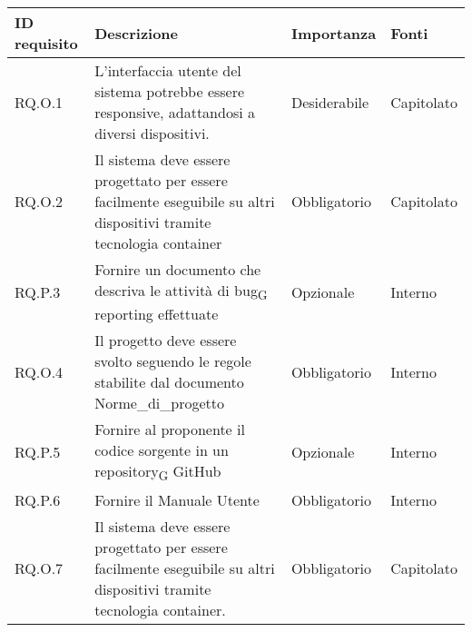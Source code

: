 \begin{longtable}{|C{2.7cm}|L{7.2cm}|C{2.7cm}|C{2cm}|}
        \hline
        \textbf{ID requisito} & \textbf{Descrizione} & \textbf{Importanza} & \textbf{Fonti}  \\
        \hline
       
        \hline
        RQ.O.1 & L'interfaccia utente del sistema potrebbe essere responsive, adattandosi a diversi dispositivi. & Desiderabile & Capitolato \\
        \hline
        RQ.O.2 & Il sistema deve essere progettato per essere facilmente eseguibile su altri dispositivi tramite tecnologia container & Obbligatorio & Capitolato \\
        
        \hline
        RQ.P.3 & Fornire un documento che descriva le attività di bug\textsubscript{G} reporting effettuate & Opzionale & Interno \\
        \hline
        RQ.O.4 & Il progetto deve essere svolto seguendo le regole stabilite dal documento Norme\_di\_progetto & Obbligatorio & Interno \\
        \hline
        RQ.P.5 & Fornire al proponente il codice sorgente in un
        repository\textsubscript{G} GitHub & Opzionale & Interno \\
        \hline
        RQ.P.6 & Fornire il Manuale Utente & Obbligatorio & Interno \\
        \hline
        RQ.O.7 & Il sistema deve essere progettato per essere facilmente eseguibile su altri dispositivi tramite tecnologia container. & Obbligatorio & Capitolato \\
        \hline
        
        


\end{longtable}